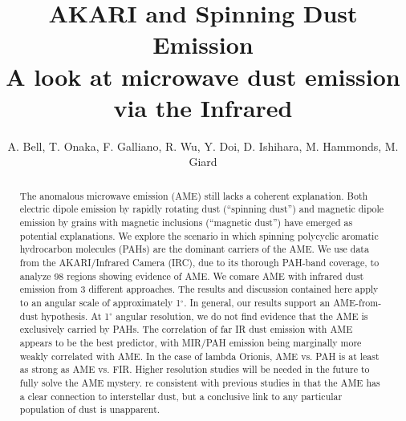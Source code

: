 \documentclass[preprint2,longabstract]{aastex}
\begin{document}

\title{AKARI and Spinning Dust Emission\\
A look at microwave dust emission via the Infrared}



\author{A. Bell, T. Onaka, F. Galliano, R. Wu, Y. Doi, D. Ishihara, M. Hammonds, M. Giard}


\begin{abstract}
The anomalous microwave emission (AME) still lacks a coherent explanation. Both electric dipole emission by rapidly rotating dust (``spinning dust'') and magnetic dipole emission by grains with magnetic inclusions (``magnetic dust'') have emerged as potential explanations. We explore the scenario in which spinning polycyclic aromatic hydrocarbon molecules (PAHs) are the dominant carriers of the AME. We use data from the AKARI/Infrared Camera (IRC), due to its thorough PAH-band coverage, to analyze 98 regions showing evidence of AME.   We comare AME with infrared dust emission from 3 different approaches. The results and discussion contained here apply to an angular scale of approximately 1$^{\circ}$. In general, our results support an AME-from-dust hypothesis. At 1$^{\circ}$ angular resolution, we do not find evidence that the AME is exclusively carried by PAHs. The correlation of far IR dust emission with AME appears to be the best predictor, with MIR/PAH emission being marginally more weakly correlated with AME. In the case of lambda Orionis, AME vs. PAH is at least as strong as AME vs. FIR. Higher resolution studies will be needed in the future to fully solve the AME mystery. re consistent with previous studies in that the AME has a clear connection to interstellar dust, but a conclusive link to any particular population of dust is unapparent.
\end{abstract}
\end{document}
